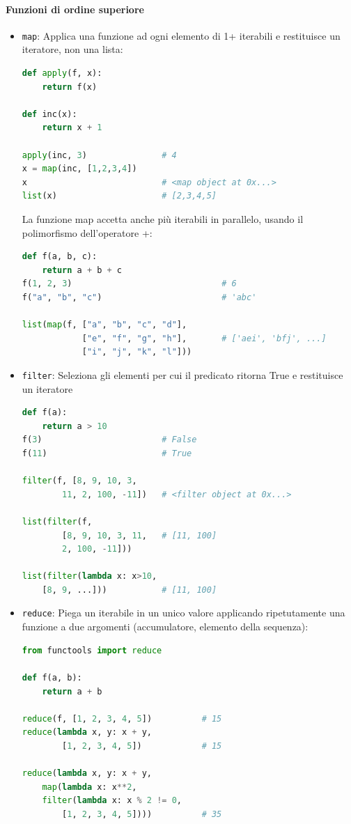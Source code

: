 \documentclass[12pt]{extarticle}
\begin{document}
\paragraph{Funzioni di ordine superiore}
\begin{itemize}
    \item \texttt{map}: Applica una funzione ad ogni elemento di 1+ iterabili e restituisce un iteratore, non una lista:
\begin{lstlisting}[language=Python]
def apply(f, x):
    return f(x)

def inc(x):
    return x + 1

apply(inc, 3)               # 4
x = map(inc, [1,2,3,4])
x                           # <map object at 0x...>
list(x)                     # [2,3,4,5]
\end{lstlisting}
La funzione map accetta anche più iterabili in parallelo, usando il polimorfismo dell'operatore +:
\begin{lstlisting}[language=Python]
def f(a, b, c):
    return a + b + c
f(1, 2, 3)                              # 6
f("a", "b", "c")                        # 'abc'

list(map(f, ["a", "b", "c", "d"],
            ["e", "f", "g", "h"],       # ['aei', 'bfj', ...]
            ["i", "j", "k", "l"]))
\end{lstlisting}

    \item \texttt{filter}: Seleziona gli elementi per cui il predicato ritorna True e restituisce un iteratore
\begin{lstlisting}[language=Python]
def f(a):
    return a > 10
f(3)                        # False
f(11)                       # True

filter(f, [8, 9, 10, 3, 
        11, 2, 100, -11])   # <filter object at 0x...>

list(filter(f, 
        [8, 9, 10, 3, 11,   # [11, 100]
        2, 100, -11]))

list(filter(lambda x: x>10,
    [8, 9, ...]))           # [11, 100]
\end{lstlisting}

    \item \texttt{reduce}: Piega un iterabile in un unico valore applicando ripetutamente una funzione a due argomenti (accumulatore, elemento della sequenza):
\begin{lstlisting}[language=Python]
from functools import reduce

def f(a, b):
    return a + b

reduce(f, [1, 2, 3, 4, 5])          # 15
reduce(lambda x, y: x + y,
        [1, 2, 3, 4, 5])            # 15

reduce(lambda x, y: x + y,
    map(lambda x: x**2,
    filter(lambda x: x % 2 != 0,
        [1, 2, 3, 4, 5])))          # 35
\end{lstlisting}
\end{itemize}
\end{document}
